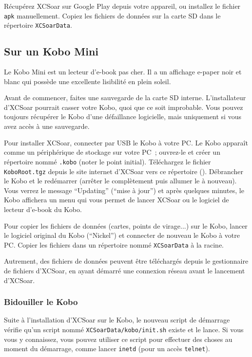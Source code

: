 Récupérez XCSoar sur Google Play depuis votre appareil, ou installez le fichier \verb|apk|
manuellement. Copiez les fichiers de données sur la carte SD dans le répertoire \verb|XCSoarData|.

\subsection*{Sur un Kobo Mini}

Le Kobo Mini est un lecteur d'e-book pas cher. Il a un affichage
e-paper noir et blanc qui possède une excellente lisibilité en plein soleil.

Avant de commencer, faites une sauvegarde de la carte SD interne. L'installateur d'XCSoar
pourrait casser votre Kobo, quoi que ce soit improbable. Vous pouvez toujours récupérer le Kobo
d'une défaillance logicielle, mais uniquement si vous avez accès à une sauvegarde.

Pour installer XCSoar, connecter par USB le Kobo à votre PC. Le Kobo 
apparaît comme un périphérique de stockage sur votre PC~; ouvrez-le et créer un
répertoire nommé \texttt{.kobo} (noter le point initial). Téléchargez le 
fichier \texttt{KoboRoot.tgz} depuis le site internet d'XCSoar vers ce
répertoire (). Débrancher le Kobo et le redémarrer (arrêter le complètement
puis allumer le à nouveau). Vous verrez le message ``Updating'' (``mise à jour'') et
après quelques minutes, le Kobo affichera un menu qui vous permet de lancer
XCSoar ou le logiciel de lecteur d'\mbox{e-book} du Kobo.

Pour copier les fichiers de données (cartes, points de virage...) sur le Kobo, lancer le 
logiciel original du Kobo (``Nickel'') et connecter de nouveau le Kobo à votre PC.
Copier les fichiers dans un répertoire nommé \texttt{XCSoarData} à la racine.

Autrement, des fichiers de données peuvent être téléchargés depuis le gestionnaire de fichiers d'XCSoar,
en ayant démarré une connexion réseau avant le lancement d'XCSoar.

\subsubsection{Bidouiller le Kobo}

Suite à l'installation d'XCSoar sur le Kobo, le nouveau script de démarrage vérifie qu'un
script nommé \texttt{XCSoarData/kobo/init.sh} existe et le lance. Si
vous vous y connaissez, vous pouvez utiliser ce script pour effectuer des choses au
moment du démarrage, comme lancer \texttt{inetd} (pour un accès \texttt{telnet}).

